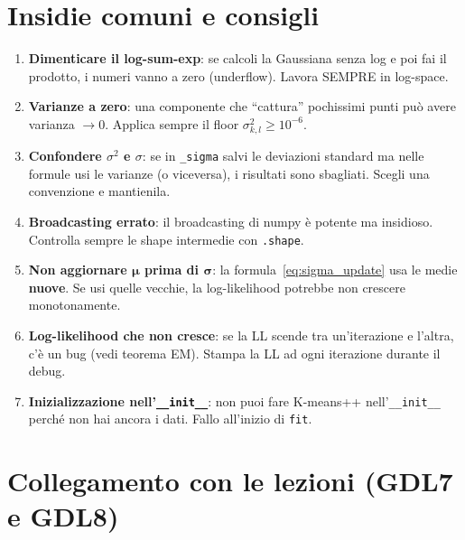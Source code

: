 \documentclass[11pt,a4paper]{article}
\begin{document}
\section{Insidie comuni e consigli}

\begin{warnbox}
\begin{enumerate}
    \item \textbf{Dimenticare il log-sum-exp}: se calcoli la Gaussiana senza log e poi fai il prodotto, i numeri vanno a zero (underflow). Lavora SEMPRE in log-space.

    \item \textbf{Varianze a zero}: una componente che ``cattura'' pochissimi punti pu\`o avere varianza $\to 0$. Applica sempre il floor $\sigma_{k,l}^2 \geq 10^{-6}$.

    \item \textbf{Confondere $\sigma^2$ e $\sigma$}: se in \texttt{\_sigma} salvi le deviazioni standard ma nelle formule usi le varianze (o viceversa), i risultati sono sbagliati. Scegli una convenzione e mantienila.

    \item \textbf{Broadcasting errato}: il broadcasting di numpy \`e potente ma insidioso. Controlla sempre le shape intermedie con \texttt{.shape}.

    \item \textbf{Non aggiornare $\boldsymbol{\mu}$ prima di $\boldsymbol{\sigma}$}: la formula~\eqref{eq:sigma_update} usa le medie \textbf{nuove}. Se usi quelle vecchie, la log-likelihood potrebbe non crescere monotonamente.

    \item \textbf{Log-likelihood che non cresce}: se la LL scende tra un'iterazione e l'altra, c'\`e un bug (vedi teorema EM). Stampa la LL ad ogni iterazione durante il debug.

    \item \textbf{Inizializzazione nell'\texttt{\_\_init\_\_}}: non puoi fare K-means++ nell'\texttt{\_\_init\_\_} perch\'e non hai ancora i dati. Fallo all'inizio di \texttt{fit}.
\end{enumerate}
\end{warnbox}

\section{Collegamento con le lezioni (GDL7 e GDL8)}
\end{document}
